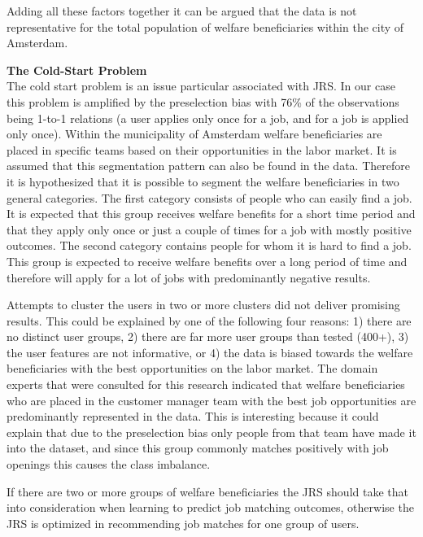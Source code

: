 Adding all these factors together it can be argued that the data is not representative for the total population of welfare beneficiaries within the city of Amsterdam. 

\noindent
\textbf{The Cold-Start Problem}\\
The cold start problem is an issue particular associated with JRS. In our case this problem is amplified by the preselection bias with 76\% of the observations being 1-to-1 relations (a user applies only once for a job, and for a job is applied only once). 
Within the municipality of Amsterdam welfare beneficiaries are placed in specific teams based on their opportunities in the labor market.
It is assumed that this segmentation pattern can also be found in the data.
Therefore it is hypothesized that it is possible to segment the welfare beneficiaries in two general categories.
The first category consists of people who can easily find a job. 
It is expected that this group receives welfare benefits for a short time period and that they apply only once or just a couple of times for a job with mostly positive outcomes. 
The second category contains people for whom it is hard to find a job. 
This group is expected to receive welfare benefits over a long period of time and therefore will apply for a lot of jobs with predominantly negative results.

Attempts to cluster the users in two or more clusters did not deliver promising results.
This could be explained by one of the following four reasons: 1) there are no distinct user groups, 2) there are far more user groups than tested (400+), 3) the user features are not informative, or 4) the data is biased towards the welfare beneficiaries with the best opportunities on the labor market.
The domain experts that were consulted for this research indicated that welfare beneficiaries who are placed in the customer manager team with the best job opportunities are predominantly represented in the data.  
This is interesting because it could explain that due to the preselection bias only people from that team have made it into the dataset, and since this group commonly matches positively with job openings this causes the class imbalance.

If there are two or more groups of welfare beneficiaries the JRS should take that into consideration when learning to predict job matching outcomes, otherwise the JRS is optimized in recommending job matches for one group of users. 

